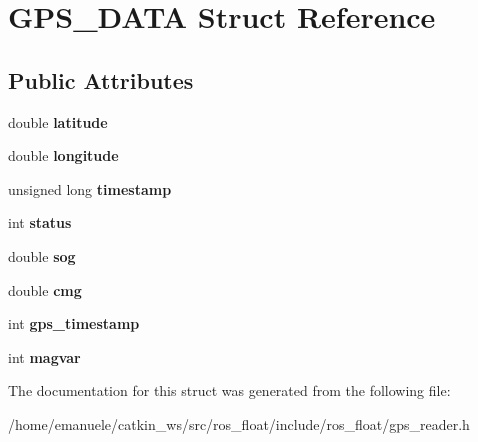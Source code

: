 \hypertarget{structGPS__DATA}{}\section{G\+P\+S\+\_\+\+D\+A\+TA Struct Reference}
\label{structGPS__DATA}
\subsection*{Public Attributes}
\begin{DoxyCompactItemize}
\item 
\mbox{\label{structGPS__DATA_a8b47080424717840dcd1d7735966a35e}} 
double {\bfseries latitude}
\item 
\mbox{\label{structGPS__DATA_aacdddf8ba4d5421d79f9743802282059}} 
double {\bfseries longitude}
\item 
\mbox{\label{structGPS__DATA_a267d72bc5ffa62d95a436a0f3174880b}} 
unsigned long {\bfseries timestamp}
\item 
\mbox{\label{structGPS__DATA_ae4b07b5117bf09d17562a444e9008b5b}} 
int {\bfseries status}
\item 
\mbox{\label{structGPS__DATA_a0ae225b2748132bcc53492ae77beed21}} 
double {\bfseries sog}
\item 
\mbox{\label{structGPS__DATA_a5d801c847ed250f719ddbc6bef40747a}} 
double {\bfseries cmg}
\item 
\mbox{\label{structGPS__DATA_a78c013260c16e31689f465b13dbd4181}} 
int {\bfseries gps\+\_\+timestamp}
\item 
\mbox{\label{structGPS__DATA_a23978978be610dac2f247312bb1b32e1}} 
int {\bfseries magvar}
\end{DoxyCompactItemize}


The documentation for this struct was generated from the following file\+:\begin{DoxyCompactItemize}
\item 
/home/emanuele/catkin\+\_\+ws/src/ros\+\_\+float/include/ros\+\_\+float/gps\+\_\+reader.\+h\end{DoxyCompactItemize}
